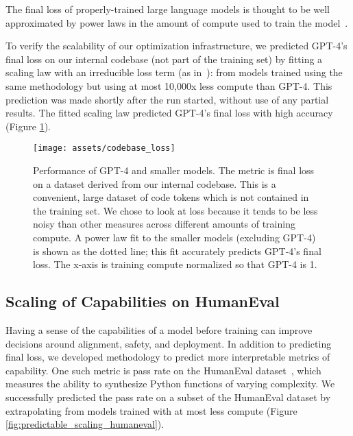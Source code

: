 \documentclass{article}
\begin{document}
The final loss of properly-trained large language models is thought to be well approximated by power laws in the amount of compute used to train the model~\citep{hestness2017deep, thompson2020computational, hoffmann2022training,kaplan2020scaling,henighan2020scaling}.

To verify the scalability of our optimization infrastructure, we predicted GPT-4’s final loss on our internal codebase (not part of the training set) by fitting a scaling law with an irreducible loss term (as in~\citet{henighan2020scaling}):  from models trained using the same methodology but using at most 10,000x less compute than GPT-4. This prediction was made shortly after the run started, without use of any partial results. The fitted scaling law predicted GPT-4's final loss with high accuracy (Figure \ref{fig:predictable_scaling_loss}). 

\begin{figure}[htbp]
    \centering
    \texttt{[image: assets/codebase\_loss]}
    \caption{Performance of GPT-4 and smaller models. The metric is final loss on a dataset derived from our internal codebase. This is a convenient, large dataset of code tokens which is not contained in the training set. We chose to look at loss because it tends to be less noisy than other measures across different amounts of training compute. A power law fit to the smaller models (excluding GPT-4) is shown as the dotted line; this fit accurately predicts GPT-4's final loss. The x-axis is training compute normalized so that GPT-4 is 1.
    }
    \label{fig:predictable_scaling_loss}
\end{figure}

\subsection{Scaling of Capabilities on HumanEval}


Having a sense of the capabilities of a model before training can improve decisions around alignment, safety, and deployment. In addition to predicting final loss, we developed methodology to predict more interpretable metrics of capability. One such metric is pass rate on the HumanEval dataset~\citep{chen2021codex}, which measures the ability to synthesize Python functions of varying complexity. We successfully predicted the pass rate on a subset of the HumanEval dataset by extrapolating from models trained with at most  less compute (Figure \ref{fig:predictable_scaling_humaneval}).
\end{document}

